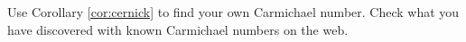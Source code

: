   Use Corollary \ref{cor:cernick} to find your own Carmichael number.
  Check what you have discovered with known Carmichael numbers on the web.
